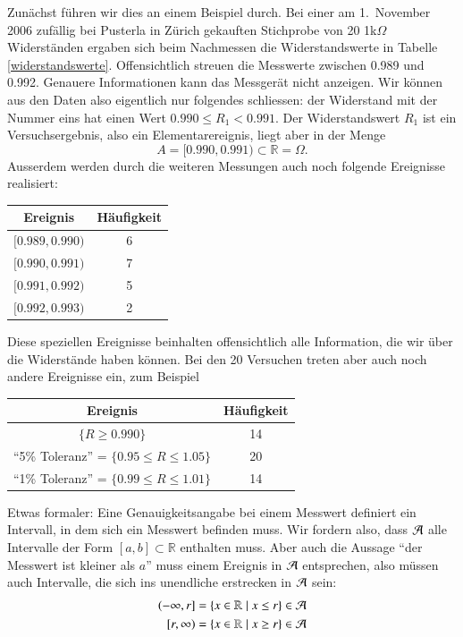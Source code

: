 Zunächst führen wir dies an einem Beispiel durch.
Bei einer am 1.~November 2006
zufällig bei Pusterla in Zürich gekauften Stichprobe von 20 1k$\Omega$
Widerständen ergaben sich beim Nachmessen die Widerstandswerte in 
Tabelle \ref{widerstandswerte}.
Offensichtlich streuen die Messwerte
zwischen 0.989 und 0.992.
Genauere Informationen kann das Messgerät nicht
anzeigen.
Wir können aus den Daten also eigentlich nur folgendes schliessen:
der Widerstand mit der Nummer eins hat einen Wert $0.990\le R_1<0.991$.
Der Widerstandswert $R_1$ ist ein Versuchsergebnis, also ein Elementarereignis,
liegt aber in der Menge
\[
A=[0.990,0.991)\subset \mathbb{R}=\Omega.
\]
Ausserdem werden durch die weiteren Messungen auch noch folgende
Ereignisse realisiert:
\begin{center}
\begin{tabular}{|c|c|}
\hline
Ereignis&Häufigkeit\\
\hline
$[0.989,0.990)$&6\\
$[0.990,0.991)$&7\\
$[0.991,0.992)$&5\\
$[0.992,0.993)$&2\\
\hline
\end{tabular}
\end{center}
Diese speziellen Ereignisse beinhalten offensichtlich alle Information,
die wir über die Widerstände haben können.
Bei den 20 Versuchen treten aber auch noch andere Ereignisse ein,
zum Beispiel
\begin{center}
\begin{tabular}{|c|c|}
\hline
Ereignis&Häufigkeit\\
\hline
$\{R\ge 0.990\}$&14\\
``5\% Toleranz'' = $\{0.95\le R\le1.05\}$&20\\
``1\% Toleranz'' = $\{0.99\le R\le 1.01\}$&14\\
\hline
\end{tabular}
\end{center}

Etwas formaler: Eine Genauigkeitsangabe bei einem Messwert definiert
ein Intervall, in dem sich ein Messwert befinden muss.
Wir
fordern also, dass $\cal A$ alle Intervalle der Form $[a,b]\subset\mathbb R$
enthalten muss.
Aber auch die Aussage ``der Messwert ist kleiner als $a$''
muss einem Ereignis in $\cal A$ entsprechen, also müssen auch Intervalle,
die sich ins unendliche erstrecken in $\cal A$ sein:
\begin{align*}{}
(-\infty,r]&=\{x\in\mathbb R\;|\;x \le r\} \in \cal A\\
\;[r,\infty)&=\{x\in\mathbb R\;|\;x \ge r\} \in \cal A
\end{align*}

